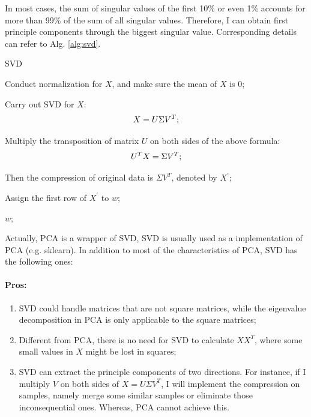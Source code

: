 \documentclass[12pt,a4paper]{article}
\theoremstyle{definition}
\begin{document}
In most cases, the sum of singular values of the first 10\% or even 1\% accounts for more than 99\% of the sum of all singular values. Therefore, I can obtain first principle components through the biggest singular value. Corresponding details can refer to Alg. \ref{alg:svd}.

\vspace{0.01\linewidth}
\begin{algorithm}[H]
	\caption{SVD}
	\label{alg:svd}
	\vspace{0.25\baselineskip}
	
	
	Conduct normalization for $X$, and make sure the mean of $X$ is 0;
	
	Carry out SVD for $X$:
	\begin{equation*}
		\centering
		X = U \Sigma V^T;
	\end{equation*}
	
	Multiply the transposition of matrix $U$ on both sides of the above formula:
	\begin{equation*}
		\centering
		U^TX = \Sigma V^T;
	\end{equation*}
	
	Then the compression of original data is $\Sigma V^T$, denoted by $X^{'}$;
	
	Assign the first row of $X^{'}$ to $w$;
	
	\Return $w$;
\end{algorithm}
\vspace{0.01\linewidth}

Actually, PCA is a wrapper of SVD, SVD is usually used as a implementation of PCA (e.g. sklearn). In addition to most of the characteristics of PCA, SVD has the following ones:

\vspace{-0.012\linewidth}
\paragraph{Pros:}
\begin{enumerate}
	\item SVD could handle matrices that are not square matrices, while the eigenvalue decomposition in PCA is only applicable to the square matrices;
	
	\item Different from PCA, there is no need for SVD to calculate $XX^T$, where some small values in $X$ might be lost in squares;
	
	\item SVD can extract the principle components of two directions. For instance, if I multiply $V$ on both sides of $X=U \Sigma V^T$, I will implement the compression on samples, namely merge some similar samples or eliminate those inconsequential ones. Whereas, PCA cannot achieve this.
\end{enumerate}
\end{document}
